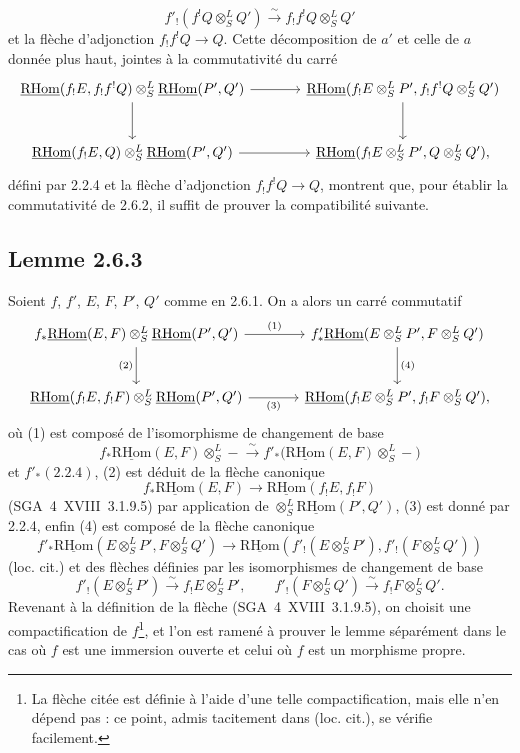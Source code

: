 \documentclass[11pt]{article}
\newcommand{\R}{\mathrm{R}}\newcommand{\RHomCore}{\mathrm{RHom}}
\providecommand{\RHom}{\RHomCore}
\providecommand{\uRHom}{\underline{\RHom}}
\providecommand{\RHom}{\RHomCore}
\providecommand{\RHom}{\R\mathcal{H}om}
\providecommand{\R}{\mathrm R}
\providecommand{\RHom}{\RHomCore}
\begin{document}
\[
f'_!(f^!Q\otimes^L_SQ')\xrightarrow{\sim}f_!f^!Q\otimes^L_SQ'
\]
et la flèche d'adjonction $f_!f^!Q\to Q$. Cette décomposition de $a'$ et celle de $a$ donnée plus haut, jointes à la commutativité du carré
\[
\begin{tikzcd}[column sep=large,row sep=large]
\uRHom(f_!E,f_!f^!Q)\otimes^L_S\uRHom(P',Q') \arrow[r] \arrow[d] & \uRHom(f_!E\otimes^L_SP',f_!f^!Q\otimes^L_SQ') \arrow[d]\\
\uRHom(f_!E,Q)\otimes^L_S\uRHom(P',Q') \arrow[r] & \uRHom(f_!E\otimes^L_SP',Q\otimes^L_SQ'),
\end{tikzcd}
\]
défini par 2.2.4 et la flèche d'adjonction $f_!f^!Q\to Q$, montrent que, pour établir la commutativité de 2.6.2, il suffit de prouver la compatibilité suivante.

\subsection*{Lemme 2.6.3}
Soient $f$, $f'$, $E$, $F$, $P'$, $Q'$ comme en 2.6.1. On a alors un carré commutatif
\[
\begin{tikzcd}[column sep=large,row sep=large]
f_*\uRHom(E,F)\otimes^L_S\uRHom(P',Q') \arrow[r,"(1)"] \arrow[d,"(2)"'] & f'_*\uRHom(E\otimes^L_SP',F\otimes^L_SQ') \arrow[d,"(4)"]\\
\uRHom(f_!E,f_!F)\otimes^L_S\uRHom(P',Q') \arrow[r,"(3)"'] & \uRHom(f_!E\otimes^L_SP',f_!F\otimes^L_SQ'),
\end{tikzcd}
\]
où (1) est composé de l'isomorphisme de changement de base
\[
f_*\uRHom(E,F)\otimes^L_S -\xrightarrow{\sim}f'_*\bigl(\uRHom(E,F)\otimes^L_S-\bigr)
\]
et $f'_*(2.2.4)$, (2) est déduit de la flèche canonique
\[
f_*\uRHom(E,F)\longrightarrow\uRHom(f_!E,f_!F)
\]
(SGA~4~XVIII~3.1.9.5) par application de $\otimes^L_S\uRHom(P',Q')$, (3) est donné par 2.2.4, enfin (4) est composé de la flèche canonique
\[
f'_*\uRHom(E\otimes^L_SP',F\otimes^L_SQ')
\longrightarrow
\uRHom(f'_!(E\otimes^L_SP'),f'_!(F\otimes^L_SQ'))
\]
(loc. cit.) et des flèches définies par les isomorphismes de changement de base
\[
f'_!(E\otimes^L_SP')\xrightarrow{\sim}f_!E\otimes^L_SP',
\qquad
f'_!(F\otimes^L_SQ')\xrightarrow{\sim}f_!F\otimes^L_SQ'.
\]
Revenant à la définition de la flèche (SGA~4~XVIII~3.1.9.5), on choisit une compactification de $f$\footnote{La flèche citée est définie à l'aide d'une telle compactification, mais elle n'en dépend pas : ce point, admis tacitement dans (loc. cit.), se vérifie facilement.}, et l'on est ramené à prouver le lemme séparément dans le cas où $f$ est une immersion ouverte et celui où $f$ est un morphisme propre.
\end{document}
